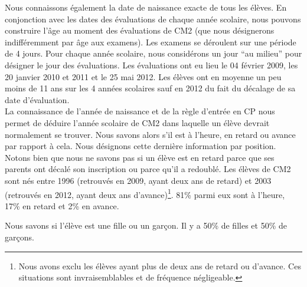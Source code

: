 \documentclass[
]{book}
\begin{document}
\quad Nous connaissons également la date de naissance exacte de tous les élèves. En conjonction avec les dates des évaluations de chaque année scolaire, nous pouvons construire l'âge au moment des évaluations de CM2 (que nous désignerons indifféremment par âge aux examens). Les examens se déroulent sur une période de 4 jours. Pour chaque année scolaire, nous considérons un jour ``au milieu'' pour désigner le jour des évaluations. Les évaluations ont eu lieu le 04 février 2009, les 20 janvier 2010 et 2011 et le 25 mai 2012. Les élèves ont en moyenne un peu moins de 11 ans sur les 4 années scolaires sauf en 2012 du fait du décalage de sa date d'évaluation.\\
La connaissance de l'année de naissance et de la règle d'entrée en CP nous permet de déduire l'année scolaire de CM2 dans laquelle un élève devrait normalement se trouver. Nous savons alors s'il est à l'heure, en retard ou avance par rapport à cela. Nous désignons cette dernière information par position. Notons bien que nous ne savons pas si un élève est en retard parce que ses parents ont décalé son inscription ou parce qu'il a redoublé. Les élèves de CM2 sont nés entre 1996 (retrouvés en 2009, ayant deux ans de retard) et 2003 (retrouvés en 2012, ayant deux ans d'avance)\footnote{Nous avons exclu les élèves ayant plus de deux ans de retard ou d'avance. Ces situations sont invraisemblables et de fréquence négligeable.}. 81\% parmi eux sont à l'heure, 17\% en retard et 2\% en avance.

\quad Nous savons si l'élève est une fille ou un garçon. Il y a 50\% de filles et 50\% de garçons.
\end{document}
